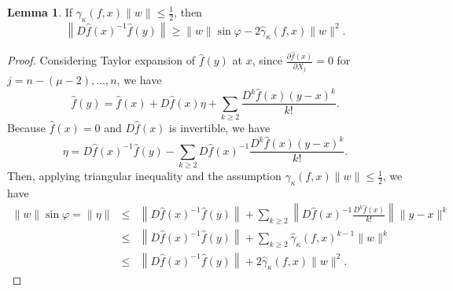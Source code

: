 \documentclass[12pt,oneside,reqno]{amsart}
\theoremstyle{definition}
\newtheorem{lem}[thm]{Lemma}
\begin{document}
\begin{lem}\cite[Lemma 1]{hao2017computing}\label{lem:bigAngleCase}
	If $\gamma_\kappa(f,x)\|w\|\leq \frac{1}{2}$, then
	\[\left\|D\hat{f}(x)^{-1}\hat{f}(y)\right\|\geq \|w\|\sin\varphi -2\hat{\gamma}_\kappa(f,x)\|w\|^2.\]
\end{lem}
\begin{proof}
Considering Taylor expansion of $\hat{f}(y)$ at $x$, since $\frac{\partial\hat{f}(x)}{\partial X_{j}}=0$ for $j=n-(\mu-2),\dots, n$, we have 
\[\hat{f}(y)=\hat{f}(x)+D\hat{f}(x)\eta +\sum\limits_{k\geq 2}\frac{D^k\hat{f}(x)(y-x)^k}{k!}.\]
Because $\hat{f}(x)=0$ and $D\hat{f}(x)$ is invertible, we have
\[\eta = D\hat{f}(x)^{-1}\hat{f}(y)-\sum\limits_{k\geq 2}D\hat{f}(x)^{-1}\frac{D^k\hat{f}(x)(y-x)^k}{k!}.\]
Then, applying triangular inequality and the assumption $\gamma_\kappa(f,x)\|w\|\leq \frac{1}{2}$, we have
\begin{eqnarray*}
\|w\|\sin\varphi =\|\eta\| & \leq & \left\|D\hat{f}(x)^{-1}\hat{f}(y)\right\|+\sum\limits_{k\geq 2}\left\|D\hat{f}(x)^{-1}\frac{D^k\hat{f}(x)}{k!}\right\|\|y-x\|^k\\
&\leq & \left\|D\hat{f}(x)^{-1}\hat{f}(y)\right\| + \sum\limits_{k\geq 2}\hat{\gamma}_{\kappa}(f,x)^{k-1}\|w\|^k\\
& \leq & \left\|D\hat{f}(x)^{-1}\hat{f}(y)\right\| +2\hat{\gamma}_\kappa(f,x)\|w\|^2.
\end{eqnarray*}
\end{proof}
\end{document}
